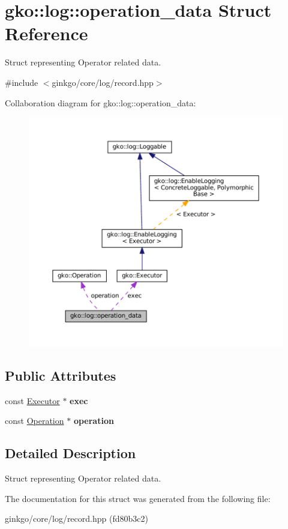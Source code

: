 \hypertarget{structgko_1_1log_1_1operation__data}{}\section{gko\+:\+:log\+:\+:operation\+\_\+data Struct Reference}
\label{structgko_1_1log_1_1operation__data}


Struct representing Operator related data.  




{\ttfamily \#include $<$ginkgo/core/log/record.\+hpp$>$}



Collaboration diagram for gko\+:\+:log\+:\+:operation\+\_\+data\+:
\nopagebreak
\begin{figure}[H]
\begin{center}
\leavevmode
\includegraphics[width=350pt]{structgko_1_1log_1_1operation__data__coll__graph}
\end{center}
\end{figure}
\subsection*{Public Attributes}
\begin{DoxyCompactItemize}
\item 
\mbox{\label{structgko_1_1log_1_1operation__data_ad5a3a3e76a8dc5b8ca240084585fd6e7}} 
const \hyperlink{classgko_1_1Executor}{Executor} $\ast$ {\bfseries exec}
\item 
\mbox{\label{structgko_1_1log_1_1operation__data_a92dc7de984a101b8f93a05d3f3502d7c}} 
const \hyperlink{classgko_1_1Operation}{Operation} $\ast$ {\bfseries operation}
\end{DoxyCompactItemize}


\subsection{Detailed Description}
Struct representing Operator related data. 



The documentation for this struct was generated from the following file\+:\begin{DoxyCompactItemize}
\item 
ginkgo/core/log/record.\+hpp (fd80b3c2)\end{DoxyCompactItemize}
